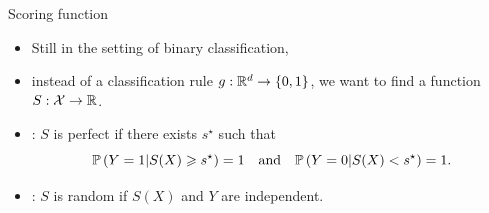 \documentclass[xcolor={usenames,dvipsnames},handout]{beamer}
\begin{document}
\begin{frame}{Scoring function}
\begin{itemize}
\item Still in the setting of binary classification, 
\item instead of a classification rule $g : \R^d \to \{0,1\}$, we want to find a function $S : \Xc \to \R$.
\end{itemize}

\begin{definition}
\hfill 
\begin{itemize}
\item {}: $S$ is perfect if there exists $s^\star$ such that
$$
\P \left( Y=1 | S(X) \geq s^\star \right) = 1 \quad \text{and} \quad \P \left( Y=0 | S(X) < s^\star \right) = 1.
$$ 
\item {}: $S$ is random if $S(X)$ and $Y$ are independent.
\end{itemize}
\end{definition}

\end{frame}
\end{document}
